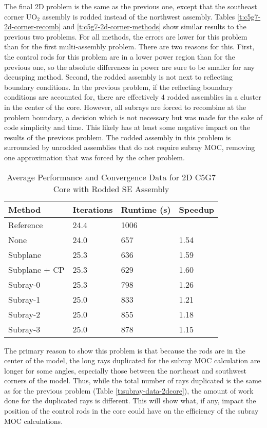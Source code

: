 The final 2D problem is the same as the previous one, except that the southeast corner UO$_2$ assembly is rodded instead of the northwest assembly.  Tables \ref{t:c5g7-2d-corner-recomb} and \ref{t:c5g7-2d-corner-methods} show similar results to the previous two problems.  For all methods, the errors are lower for this problem than for the first multi-assembly problem.  There are two reasons for this.  First, the control rods for this problem are in a lower power region than for the previous one, so the absolute differences in power are sure to be smaller for any decusping method.  Second, the rodded assembly is not next to reflecting boundary conditions.  In the previous problem, if the reflecting boundary conditions are accounted for, there are effectively 4 rodded assemblies in a cluster in the center of the core.  However, all subrays are forced to recombine at the problem boundary, a decision which is not necessary but was made for the sake of code simplicity and time.  This likely has at least some negative impact on the results of the previous problem.  The rodded assembly in this problem is surrounded by unrodded assemblies that do not require subray MOC, removing one approximation that was forced by the other problem.

\begin{table}[h]
    \centering
    \caption[2D C5G7 Core Performance Data, Corner Assembly]{Average Performance and Convergence Data for 2D C5G7 Core with Rodded SE Assembly}\label{t:subray-performance-2dcoreSE}
    \begin{tabular}{l l l l}\toprule
        Method & Iterations & Runtime (s) & Speedup \\\midrule
Reference     & 24.4 & 1006 &     \\
None          & 24.0 & 657 & 1.54 \\
Subplane      & 25.3 & 636 & 1.59 \\
Subplane + CP & 25.3 & 629 & 1.60 \\
Subray-0      & 25.3 & 798 & 1.26 \\
Subray-1      & 25.0 & 833 & 1.21 \\
Subray-2      & 25.0 & 855 & 1.18 \\
Subray-3      & 25.0 & 878 & 1.15 \\
        \bottomrule
    \end{tabular}
\end{table}

The primary reason to show this problem is that because the rods are in the center of the model, the long rays duplicated for the subray MOC calculation are longer for some angles, especially those between the northeast and southwest corners of the model.  Thus, while the total number of rays duplicated is the same as for the previous problem (Table \ref{t:subray-data-2dcore}), the amount of work done for the duplicated rays is different.  This will show what, if any, impact the position of the control rods in the core could have on the efficiency of the subray MOC calculations.


